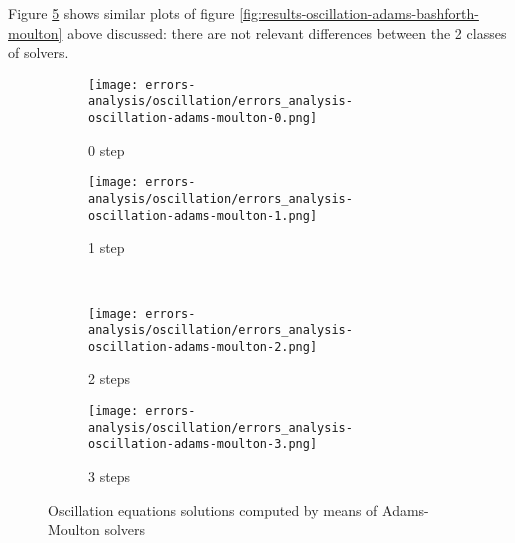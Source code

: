 Figure \ref{fig:results-oscillation-adams-moulton} shows similar plots of figure \ref{fig:results-oscillation-adams-bashforth-moulton} above discussed: there are not relevant differences between the 2 classes of solvers.

\begin{figure}[!ht]
  \centering
  \begin{subfigure}[b]{0.45\textwidth}
    \centering
    \texttt{[image: errors-analysis/oscillation/errors\_analysis-oscillation-adams-moulton-0.png]}
    \caption{0 step}\label{fig:results-oscillation-adams-moulton-0}
  \end{subfigure}\quad%
  \begin{subfigure}[b]{0.45\textwidth}
    \centering
    \texttt{[image: errors-analysis/oscillation/errors\_analysis-oscillation-adams-moulton-1.png]}
    \caption{1 step}\label{fig:results-oscillation-adams-moulton-1}
  \end{subfigure}\\
  \begin{subfigure}[b]{0.45\textwidth}
    \centering
    \texttt{[image: errors-analysis/oscillation/errors\_analysis-oscillation-adams-moulton-2.png]}
    \caption{2 steps}\label{fig:results-oscillation-adams-moulton-2}
  \end{subfigure}\quad%
  \begin{subfigure}[b]{0.45\textwidth}
    \centering
    \texttt{[image: errors-analysis/oscillation/errors\_analysis-oscillation-adams-moulton-3.png]}
    \caption{3 steps}\label{fig:results-oscillation-adams-moulton-3}
  \end{subfigure}
  \caption{Oscillation equations solutions computed by means of Adams-Moulton solvers}\label{fig:results-oscillation-adams-moulton}
\end{figure}

